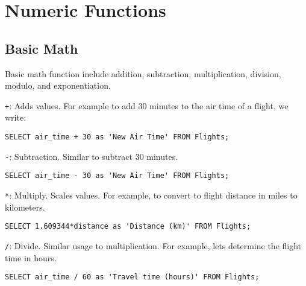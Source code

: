 \documentclass{article}
\begin{document}
  






  

\section*{Numeric Functions}

\subsection*{Basic Math}
Basic math function include addition, subtraction, multiplication,  division, modulo, and exponentiation.

 
\begin{outline}

    \1 \texttt{+}: Adds values.  For example to add 30 minutes to the air time of a flight, we write:

\begin{lstlisting}[frame=single]  
SELECT air_time + 30 as 'New Air Time' FROM Flights;
\end{lstlisting}


    \1 \texttt{-}: Subtraction.  Similar to subtract 30 minutes.  

\begin{lstlisting}[frame=single]  
SELECT air_time - 30 as 'New Air Time' FROM Flights;
\end{lstlisting}


    \1 \texttt{*}: Multiply.  Scales values.  For example, to convert to flight distance in miles to kilometers.  

\begin{lstlisting}[frame=single]  
SELECT 1.609344*distance as 'Distance (km)' FROM Flights;
\end{lstlisting}


    \1 \texttt{/}: Divide.  Similar usage to multiplication.  For example, lets determine the flight time in hours.  


\begin{lstlisting}[frame=single]  
SELECT air_time / 60 as 'Travel time (hours)' FROM Flights;
\end{lstlisting}

    
    

   
\end{outline}
 
\end{document}
